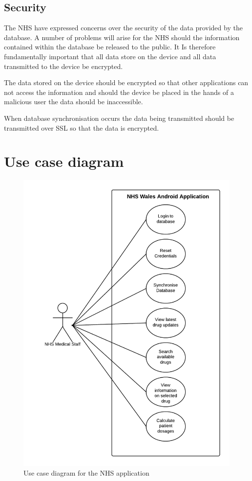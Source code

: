 \documentclass[11pt,fleqn,twoside]{article}
\begin{document}
\subsection{Security}

The NHS have expressed concerns over the security of the data provided by the database. A number of problems will arise for the NHS should the information contained within the database be released to the public. It Is therefore fundamentally important that all data store on the device and all data transmitted to the device be encrypted.

The data stored on the device should be encrypted so that other applications can not access the information and should the device be placed in the hands of a malicious user the data should be inaccessible.

When database synchronisation occurs the data being transmitted should be transmitted over SSL so that the data is encrypted.


\section{Use case diagram}
\begin{figure}[H]
\centering
\includegraphics[width=4.4in]{useCase}
\caption{Use case diagram for the NHS application}
\end{figure}
\end{document}
